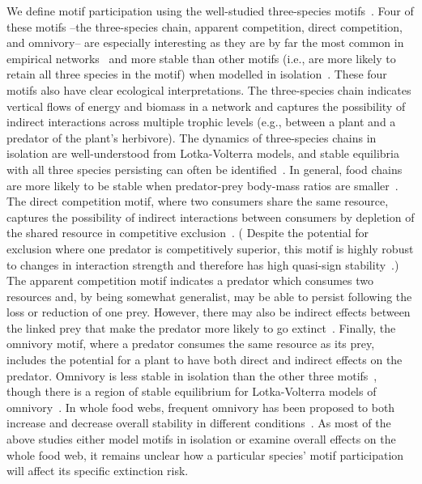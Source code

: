 \documentclass[12pt]{article}
\begin{document}
\begin{spacing}{2.0}
    We define motif participation using the well-studied three-species motifs~\citep{Milo2004,Stouffer2007,Stouffer2012,Cirtwill2015a}. 
    Four of these motifs --the three-species chain, apparent competition, direct competition, and omnivory-- are especially interesting as they are by far the most common in empirical networks~\citep{Stouffer2007, giling2019plant} and more stable than other motifs (i.e., are more likely to retain all three species in the motif) when modelled in isolation~\citep{Borrelli2015a}.
    These four motifs also have clear ecological interpretations.
    The three-species chain indicates vertical flows of energy and biomass in a network and captures the possibility of indirect interactions across multiple trophic levels (e.g., between a plant and a predator of the plant's herbivore).
    The dynamics of three-species chains in isolation are well-understood from Lotka-Volterra models, and stable equilibria with all three species persisting can often be identified~\citep{Borrelli2015a,Hsu2015}.
    In general, food chains are more likely to be stable when predator-prey body-mass ratios are smaller~\citep{Jonsson1998}.
    The direct competition motif, where two consumers share the same resource, captures the possibility of indirect interactions between consumers by depletion of the shared resource in competitive exclusion~\citep{Hsu2015}. 
   ( Despite the potential for exclusion where one predator is competitively superior, this motif is highly robust to changes in interaction strength and therefore has high quasi-sign stability~\citep{Borrelli2015a}.)
    The apparent competition motif indicates a predator which consumes two resources and, by being somewhat generalist, may be able to persist following the loss or reduction of one prey.
    However, there may also be indirect effects between the linked prey that make the predator more likely to go extinct~\citep{Melian2002}.
    Finally, the omnivory motif, where a predator consumes the same resource as its prey, includes  the potential for a plant to have both direct and indirect effects on the predator. 
    Omnivory is less stable in isolation than the other three motifs~\citep{Borrelli2015a}, though there is a region of stable equilibrium for Lotka-Volterra models of omnivory~\citep{Hsu2015}.
    In whole food webs, frequent omnivory has been proposed to both increase and decrease overall stability in different conditions~\citep{McCann1997,Emmerson2004,Monteiro2016}.
    As most of the above studies either model motifs in isolation or examine overall effects on the whole food web, it remains unclear how a particular species' motif participation will affect its specific extinction risk.


\end{spacing}
\end{document}
